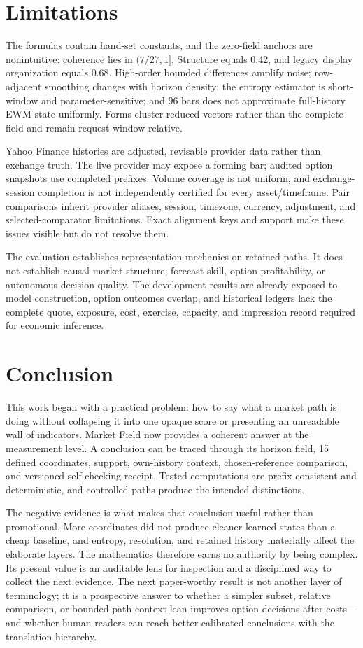 \documentclass{article}
\newcommand{\method}{Market Field}
\begin{document}
\section{Limitations}

The formulas contain hand-set constants, and the zero-field anchors are nonintuitive: coherence lies in $(7/27,1]$, Structure equals 0.42, and legacy display organization equals 0.68. High-order bounded differences amplify noise; row-adjacent smoothing changes with horizon density; the entropy estimator is short-window and parameter-sensitive; and 96 bars does not approximate full-history EWM state uniformly. Forms cluster reduced vectors rather than the complete field and remain request-window-relative.

Yahoo Finance histories are adjusted, revisable provider data rather than exchange truth. The live provider may expose a forming bar; audited option snapshots use completed prefixes. Volume coverage is not uniform, and exchange-session completion is not independently certified for every asset/timeframe. Pair comparisons inherit provider aliases, session, timezone, currency, adjustment, and selected-comparator limitations. Exact alignment keys and support make these issues visible but do not resolve them.

The evaluation establishes representation mechanics on retained paths. It does not establish causal market structure, forecast skill, option profitability, or autonomous decision quality. The development results are already exposed to model construction, option outcomes overlap, and historical ledgers lack the complete quote, exposure, cost, exercise, capacity, and impression record required for economic inference.

\section{Conclusion}

This work began with a practical problem: how to say what a market path is doing without collapsing it into one opaque score or presenting an unreadable wall of indicators. \method{} now provides a coherent answer at the measurement level. A conclusion can be traced through its horizon field, 15 defined coordinates, support, own-history context, chosen-reference comparison, and versioned self-checking receipt. Tested computations are prefix-consistent and deterministic, and controlled paths produce the intended distinctions.

The negative evidence is what makes that conclusion useful rather than promotional. More coordinates did not produce cleaner learned states than a cheap baseline, and entropy, resolution, and retained history materially affect the elaborate layers. The mathematics therefore earns no authority by being complex. Its present value is an auditable lens for inspection and a disciplined way to collect the next evidence. The next paper-worthy result is not another layer of terminology; it is a prospective answer to whether a simpler subset, relative comparison, or bounded path-context lean improves option decisions after costs---and whether human readers can reach better-calibrated conclusions with the translation hierarchy.
\end{document}
